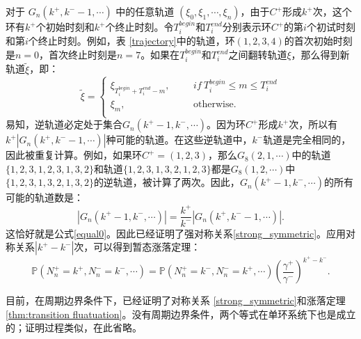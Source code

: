 对于 $G_n(k^+,k^- -1,\cdots)$ 中的任意轨道 $(\xi_0,\xi_1,\cdots,\xi_n)$，由于$C^+$形成$k^+$次，这个环有$k^+$个初始时刻和$k^+$个终止时刻。令$T_i^{begin}$和$T_i^{end}$分别表示环$C^+$的第$i$个初试时刻和第$i$个终止时刻。例如，表 \ref{trajectory}中的轨道，环$(1,2,3,4)$的首次初始时刻是$n=0$，首次终止时刻是$n=7$。如果在$T_i^{begin}$和$T_i^{end}$之间翻转轨道$\xi$，那么得到新轨道$\tilde{\xi}$，即：
\begin{equation*}
    \tilde{\xi}
    =\left\{\begin{aligned}
        \xi_{T_i^{begin}+T_i^{end}-m},&   &&if ~ T_i^{begin} \le m \le T_i^{end}\\
        \xi_m, &   && \text{otherwise}.\\
        \end{aligned}\right.
\end{equation*}
易知，逆轨道必定处于集合$G_n(k^+ -1,k^-,\cdots)$。因为环$C^+$形成$k^+$次，所以有$k^+|G_n(k^+,k^- -1, \cdots)|$种可能的轨道。在这些逆轨道中，$k^-$轨道是完全相同的，因此被重复计算。例如，如果环$C^+=(1,2,3)$，那么$G_8(2,1,\cdots)$中的轨道$\{1,2,3,1,2,3,1,3,2\}$和轨道$\{1,2,3,1,3,2,1,2,3\}$都是$G_8(1,2,\cdots)$中$\{1,2,3,1,3,2,1,3,2\}$的逆轨道，被计算了两次。因此，$G_n(k^+ -1,k^-,\cdots)$的所有可能的轨道数是：
\begin{equation}\label{equal}
    |G_n(k^+ -1,k^-,\cdots)| = \frac{k^+}{k^-}|G_n(k^+,k^- -1,\cdots)|.
\end{equation}
这恰好就是公式\ref{equal0}。因此已经证明了强对称关系\ref{strong_symmetric}。应用对称关系$|k^+ -k^-|$次，可以得到暂态涨落定理：
\begin{equation}\label{theorem:transient fluatuation}
	\mathbb{P}\left(N^+_n=k^+,N^-_n=k^-,\cdots\right)
	= \mathbb{P}\left(N^+_n=k^-,N^-_n=k^+,\cdots\right)\left(\frac{\gamma^+}{\gamma^-}\right)^{k^+-k^-}.
\end{equation}

目前，在周期边界条件下，已经证明了对称关系 \ref{strong_symmetric}和涨落定理 \ref{thm:transition fluatuation}。没有周期边界条件，两个等式在单环系统下也是成立的；证明过程类似，在此省略。

